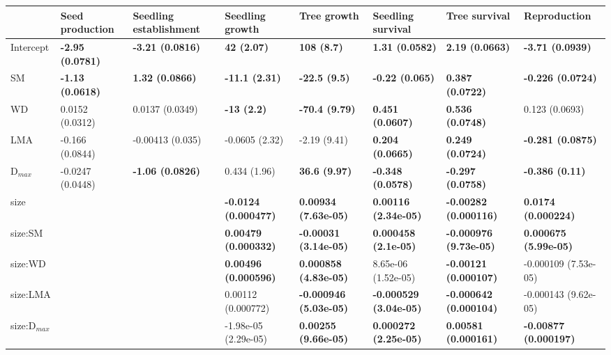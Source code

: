 \documentclass[b5paper,justified]{tufte-book} %
\begin{document}
\begin{fullwidth}
\begin{landscape}
\begin{table}
\begin{center}
\footnotesize
\vspace*{1cm}
\hspace*{4.5cm}
\begin{tabular}{p{1.1cm}p{2.1cm}p{1.8cm}p{2cm}p{2cm}p{2cm}p{2cm}p{2cm}}
  \hline
 & Seed production & Seedling establishment & Seedling growth & Tree growth & Seedling survival & Tree survival & Reproduction \\ 
  \hline
Intercept & \textbf{-2.95 (0.0781)} & \textbf{-3.21 (0.0816)} & \textbf{42 (2.07)} & \textbf{108 (8.7)} & \textbf{1.31 (0.0582)} & \textbf{2.19 (0.0663)} & \textbf{-3.71 (0.0939)} \\ 
  SM & \textbf{-1.13 (0.0618)} & \textbf{1.32 (0.0866)} & \textbf{-11.1 (2.31)} & \textbf{-22.5 (9.5)} & \textbf{-0.22 (0.065)} & \textbf{0.387 (0.0722)} & \textbf{-0.226 (0.0724)} \\ 
  WD & 0.0152 (0.0312) & 0.0137 (0.0349) & \textbf{-13 (2.2)} & \textbf{-70.4 (9.79)} & \textbf{0.451 (0.0607)} & \textbf{0.536 (0.0748)} & 0.123 (0.0693) \\ 
  LMA & -0.166 (0.0844) & -0.00413 (0.035) & -0.0605 (2.32) & -2.19 (9.41) & \textbf{0.204 (0.0665)} & \textbf{0.249 (0.0724)} & \textbf{-0.281 (0.0875)} \\ 
  D$_{max}$ & -0.0247 (0.0448) & \textbf{-1.06 (0.0826)} & 0.434 (1.96) & \textbf{36.6 (9.97)} & \textbf{-0.348 (0.0578)} & \textbf{-0.297 (0.0758)} & \textbf{-0.386 (0.11)} \\ 
  size &  &  & \textbf{-0.0124 (0.000477)} & \textbf{0.00934 (7.63e-05)} & \textbf{0.00116 (2.34e-05)} & \textbf{-0.00282 (0.000116)} & \textbf{0.0174 (0.000224)} \\ 
  size:SM &  &  & \textbf{0.00479 (0.000332)} & \textbf{-0.00031 (3.14e-05)} & \textbf{0.000458 (2.1e-05)} & \textbf{-0.000976 (9.73e-05)} & \textbf{0.000675 (5.99e-05)} \\ 
  size:WD &  &  & \textbf{0.00496 (0.000596)} & \textbf{0.000858 (4.83e-05)} & 8.65e-06 (1.52e-05) & \textbf{-0.00121 (0.000107)} & -0.000109 (7.53e-05) \\ 
  size:LMA &  &  & 0.00112 (0.000772) & \textbf{-0.000946 (5.03e-05)} & \textbf{-0.000529 (3.04e-05)} & \textbf{-0.000642 (0.000104)} & -0.000143 (9.62e-05) \\ 
  size:D$_{max}$ &  &  & -1.98e-05 (2.29e-05) & \textbf{0.00255 (9.66e-05)} & \textbf{0.000272 (2.25e-05)} & \textbf{0.00581 (0.000161)} & \textbf{-0.00877 (0.000197)} \\ 

\end{tabular}
\end{center}
\end{table}
\end{landscape}
\end{fullwidth}
\end{document}
